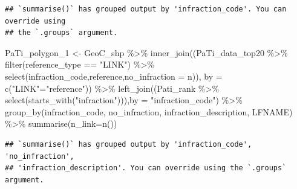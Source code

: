 \documentclass[
]{article}
\newenvironment{Shaded}{\begin{snugshade}}{\end{snugshade}}
\newcommand{\AttributeTok}[1]{\textcolor[rgb]{0.77,0.63,0.00}{#1}}
\newcommand{\FunctionTok}[1]{\textcolor[rgb]{0.00,0.00,0.00}{#1}}
\newcommand{\NormalTok}[1]{#1}
\newcommand{\OtherTok}[1]{\textcolor[rgb]{0.56,0.35,0.01}{#1}}
\newcommand{\SpecialCharTok}[1]{\textcolor[rgb]{0.00,0.00,0.00}{#1}}
\newcommand{\StringTok}[1]{\textcolor[rgb]{0.31,0.60,0.02}{#1}}
\begin{document}
\begin{verbatim}
## `summarise()` has grouped output by 'infraction_code'. You can override using
## the `.groups` argument.
\end{verbatim}

\begin{Shaded}
\begin{Highlighting}[]
\NormalTok{PaTi\_polygon\_1 }\OtherTok{\textless{}{-}}\NormalTok{ GeoC\_shp }\SpecialCharTok{\%\textgreater{}\%} 
  \FunctionTok{inner\_join}\NormalTok{((PaTi\_data\_top20 }\SpecialCharTok{\%\textgreater{}\%}
               \FunctionTok{filter}\NormalTok{(reference\_type }\SpecialCharTok{==} \StringTok{"LINK"}\NormalTok{) }\SpecialCharTok{\%\textgreater{}\%}
               \FunctionTok{select}\NormalTok{(infraction\_code,reference,}\AttributeTok{no\_infraction =}\NormalTok{ n)),}
             \AttributeTok{by =} \FunctionTok{c}\NormalTok{(}\StringTok{"LINK"}\OtherTok{=}\StringTok{"reference"}\NormalTok{)) }\SpecialCharTok{\%\textgreater{}\%} 
  \FunctionTok{left\_join}\NormalTok{((Pati\_rank }\SpecialCharTok{\%\textgreater{}\%} \FunctionTok{select}\NormalTok{(}\FunctionTok{starts\_with}\NormalTok{(}\StringTok{"infraction"}\NormalTok{))),}\AttributeTok{by =} \StringTok{"infraction\_code"}\NormalTok{) }\SpecialCharTok{\%\textgreater{}\%} 
  \FunctionTok{group\_by}\NormalTok{(infraction\_code, no\_infraction, infraction\_description, LFNAME) }\SpecialCharTok{\%\textgreater{}\%} 
  \FunctionTok{summarise}\NormalTok{(}\AttributeTok{n\_link=}\FunctionTok{n}\NormalTok{())}
\end{Highlighting}
\end{Shaded}

\begin{verbatim}
## `summarise()` has grouped output by 'infraction_code', 'no_infraction',
## 'infraction_description'. You can override using the `.groups` argument.
\end{verbatim}
\end{document}
